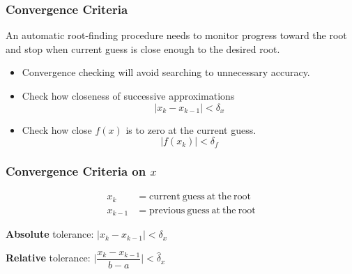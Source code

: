 \documentclass[10pt]{beamer}
\begin{document}
\begin{frame}
\frametitle{Convergence Criteria}

An automatic root-finding procedure needs to monitor progress toward the root
and stop when current guess is close enough to the desired root.

\begin{itemize}
    \item   Convergence checking will avoid searching to unnecessary accuracy.
    \item   Check how closeness of successive approximations
\begin{equation*}
                |x_k - x_{k-1}| < \delta_x
\end{equation*}
    \item   Check how close $f(x)$ is to zero at the current guess.
\begin{equation*}
                |f(x_k)| < \delta_f
\end{equation*}
\end{itemize}



\end{frame}
\begin{frame}[shrink]
\frametitle{Convergence Criteria on $x$}


\begin{center}
\end{center}

\begin{align*}
    x_k     &= \mathrm{current\ guess\ at\ the\ root}\\
    x_{k-1} &= \mathrm{previous\ guess\ at\ the\ root}
\end{align*}

\vspace{2ex}
\textbf{Absolute} tolerance: $\bigl| x_k - x_{k-1} \bigr| < \delta_x$

\textbf{Relative} tolerance: $\Biggl| \dfrac{x_k - x_{k-1}}{b-a} \Biggr| < \hat{\delta}_x$



\end{frame}
\end{document}

